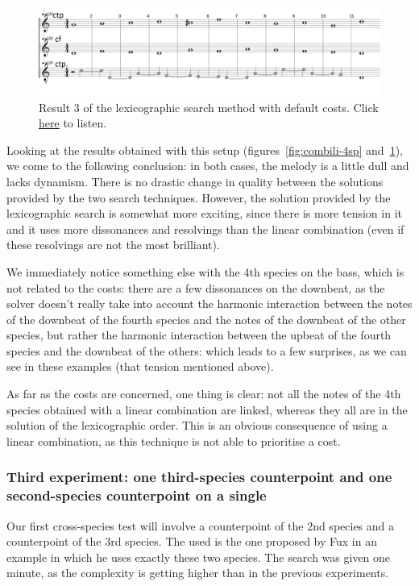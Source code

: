 \begin{figure}[h]
    \centering
    \includegraphics[width=1\textwidth]{Images/Experiments/basic-lexico-4sp.png}
    \caption{Result 3 of the lexicographic search method with default costs. Click \href{https://youtu.be/rh3YdRu62J4}{here} to listen.}
    \label{fig:lexico-4sp}
\end{figure}
Looking at the results obtained with this setup (figures~\ref{fig:combili-4sp} and~\ref{fig:lexico-4sp}), we come to the following conclusion: in both cases, the melody is a little dull and lacks dynamism. There is no drastic change in quality between the solutions provided by the two search techniques. However, the solution provided by the lexicographic search is somewhat more exciting, since there is more tension in it and it uses more dissonances and resolvings than the linear combination (even if these resolvings are not the most brilliant).

We immediately notice something else with the 4th species on the bass, which is not related to the costs: there are a few dissonances on the downbeat, as the solver doesn't really take into account the harmonic interaction between the notes of the downbeat of the fourth species and the notes of the downbeat of the other species, but rather the harmonic interaction between the upbeat of the fourth species and the downbeat of the others: which leads to a few surprises, as we can see in these examples (that tension mentioned above).

As far as the costs are concerned, one thing is clear: not all the notes of the 4th species obtained with a linear combination are linked, whereas they all are in the solution of the lexicographic order. This is an obvious consequence of using a linear combination, as this technique is not able to prioritise a cost.


\subsubsection{Third experiment: one third-species counterpoint and one second-species counterpoint on a single \cf}
Our first cross-species test will involve a counterpoint of the 2nd species and a counterpoint of the 3rd species. The \cfs used is the one proposed by Fux in an example in which he uses exactly these two species. The search was given one minute, as the complexity is getting higher than in the previous experiments. \label{subsection:third-experiment-with-costs}


